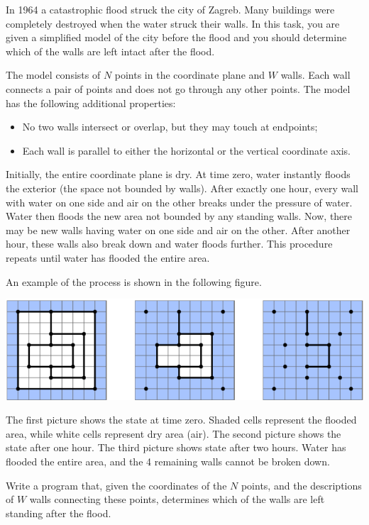In 1964 a catastrophic flood struck the city of Zagreb. Many buildings were completely destroyed when the water struck their walls. In this task, you are given a simplified model of the city before the flood and you should determine which of the walls are left intact after the flood.

The model consists of $N$ points in the coordinate plane and $W$ walls. Each wall connects a pair of points and does not go through any other points. The model has the following additional properties:

\begin{itemize}
\item No two walls intersect or overlap, but they may touch at endpoints;
\item Each wall is parallel to either the horizontal or the vertical coordinate axis.
\end{itemize}

Initially, the entire coordinate plane is dry. At time zero, water instantly floods the exterior (the space not bounded by walls). After exactly one hour, every wall with water on one side and air on the other breaks under the pressure of water. Water then floods the new area not bounded by any standing walls. Now, there may be new walls having water on one side and air on the other. After another hour, these walls also break down and
water floods further. This procedure repeats until water has flooded the entire area.

An example of the process is shown in the following figure.

\includegraphics[scale=0.5]{flood.png}

The first picture shows the state at time zero. Shaded cells represent the flooded area, while white cells represent dry area (air). The second picture shows the state after one hour. The third picture shows state after two hours. Water has flooded the entire area, and the 4 remaining walls cannot be broken down.

Write a program that, given the coordinates of the $N$ points, and the descriptions of $W$ walls connecting these points, determines which of the walls are left standing after the flood.
